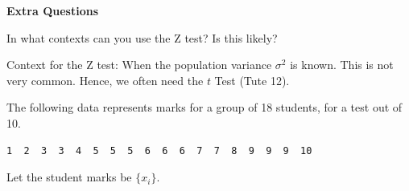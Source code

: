 \documentclass[bigtut]{tutorial}\usepackage[]{graphicx}\usepackage[]{color}
\makeatletter
\newcommand{\hlnum}[1]{\textcolor[rgb]{0.686,0.059,0.569}{#1}}%
\newcommand{\hlstd}[1]{\textcolor[rgb]{0.345,0.345,0.345}{#1}}%
\newcommand{\hlkwb}[1]{\textcolor[rgb]{0.69,0.353,0.396}{#1}}%
\newcommand{\hlkwc}[1]{\textcolor[rgb]{0.333,0.667,0.333}{#1}}%
\newcommand{\hlkwd}[1]{\textcolor[rgb]{0.737,0.353,0.396}{\textbf{#1}}}%
\newenvironment{kframe}{%
 \def\at@end@of@kframe{}%
 \ifinner\ifhmode%
  \def\at@end@of@kframe{\end{minipage}}%
  \begin{minipage}{\columnwidth}%
 \fi\fi%
 \def\FrameCommand##1{\hskip\@totalleftmargin \hskip-\fboxsep
 \colorbox{shadecolor}{##1}\hskip-\fboxsep
     \hskip-\linewidth \hskip-\@totalleftmargin \hskip\columnwidth}%
 \MakeFramed {\advance\hsize-\width
   \@totalleftmargin\z@ \linewidth\hsize
   \@setminipage}}%
 {\par\unskip\endMakeFramed%
 \at@end@of@kframe}
\newenvironment{knitrout}{}{} %
\makeatother
\begin{document}
\begin{tutorial}
\begin{questions}
\newpage
\hspace{-1cm} {\bf Extra Questions}


\question 
In what contexts can you use the Z test?  Is this likely? 

\begin{solution}
Context for the Z test: When the population variance $\sigma^2$ is known. This is not very common. Hence, we often need the $t$ Test (Tute 12).
\end{solution}


\question 
The following data represents marks for a group of 18 students, for a test out of 10.

\begin{verbatim}
1  2  3  3  4  5  5  5  6  6  6  7  7  8  9  9  9  10
\end{verbatim}



\begin{solution}
Let the student marks be $\{ x_{i} \}$. \\


\end{solution}
\end{questions}
\end{tutorial}
\end{document}
